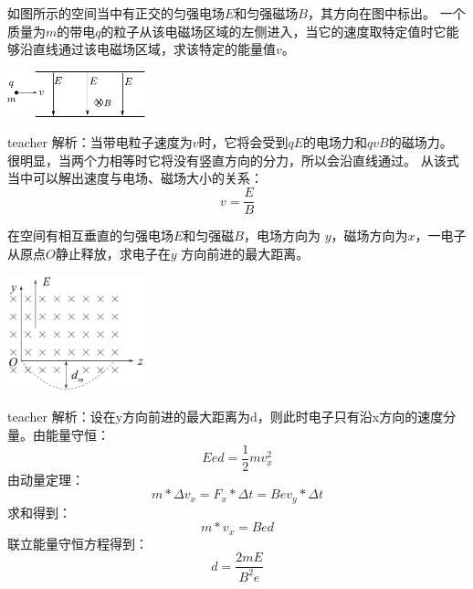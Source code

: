 \begin{example}
如图所示的空间当中有正交的匀强电场$E$和匀强磁场$B$，其方向在图中标出。
一个质量为$m$的带电$q$的粒子从该电磁场区域的左侧进入，当它的速度取特定值时它能够沿直线通过该电磁场区域，求该特定的能量值$v$。
\begin{flushright}
\includegraphics[width=0.3\textwidth]{images/mag-8.pdf} 
\end{flushright}
\begin{taggedblock}{teacher}
\noindent
解析：当带电粒子速度为$v$时，它将会受到$qE$的电场力和$qvB$的磁场力。
很明显，当两个力相等时它将没有竖直方向的分力，所以会沿直线通过。
从该式当中可以解出速度与电场、磁场大小的关系：
\[v = \frac{E}{B}\]
\end{taggedblock}
\end{example}



\begin{example}

在空间有相互垂直的匀强电场$E $和匀强磁$B$，电场方向为 $y$，磁场方向为$x$，一电子从原点$O $静止释放，求电子在$y$ 方向前进的最大距离。
\begin{flushright}
\includegraphics[width = 0.3\textwidth]{images/mag-13.pdf} 
\end{flushright}

\begin{taggedblock}{teacher}
\noindent
解析：设在y方向前进的最大距离为d，则此时电子只有沿x方向的速度分量。由能量守恒：\[Eed=\frac{1}{2}mv_x^2\]
由动量定理：\[m*\Delta v_x = F_x*\Delta t=Bev_y*\Delta t\]
求和得到：\[m*v_x=Bed\]
联立能量守恒方程得到：\[d=\frac{2mE}{B^2e}\]
\end{taggedblock}
\end{example}




